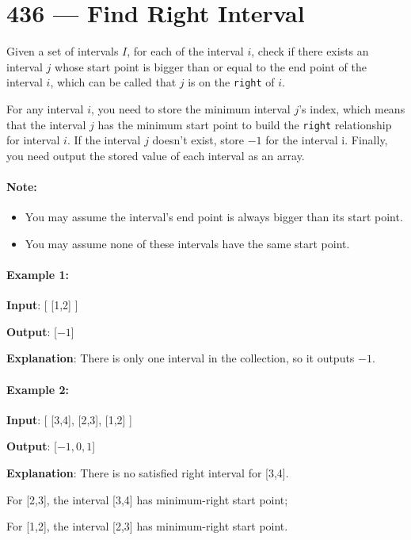 \section{436 --- Find Right Interval}
Given a set of intervals $I$, for each of the interval $i$, check if there exists an interval $j$ whose start point is bigger than or equal to the end point of the interval $i$, which can be called that $j$ is on the \texttt{right} of $ i $.

For any interval $ i $, you need to store the minimum interval $ j $'s index, which means that the interval $ j $ has the minimum start point to build the \texttt{right} relationship for interval $ i $. If the interval $ j $ doesn't exist, store $-1$ for the interval i. Finally, you need output the stored value of each interval as an array.

\paragraph{Note:}

\begin{itemize}
\item You may assume the interval's end point is always bigger than its start point.
\item You may assume none of these intervals have the same start point.
\end{itemize}
 

\paragraph{Example 1:}

\begin{flushleft}
\textbf{Input}: [ [1,2] ]

\textbf{Output}: [$-1$]

\textbf{Explanation}: There is only one interval in the collection, so it outputs $-1$.
\end{flushleft}
 

\paragraph{Example 2:}

\begin{flushleft}
\textbf{Input}: [ [3,4], [2,3], [1,2] ]

\textbf{Output}: [$-1, 0, 1$]

\textbf{Explanation}: There is no satisfied right interval for [3,4].

For [2,3], the interval [3,4] has minimum-right start point;

For [1,2], the interval [2,3] has minimum-right start point.
\end{flushleft}
 

